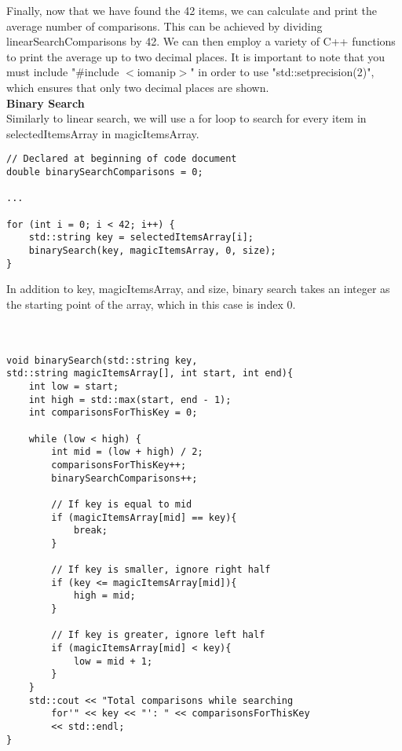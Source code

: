 \documentclass{article}
\begin{document}
Finally, now that we have found the 42 items, we can calculate and print the average number of comparisons. This can be achieved by dividing linearSearchComparisons by 42. We can then employ a variety of C++ functions to print the average up to two decimal places. It is important to note that you must include "\#include $<$iomanip$>$" in order to use "std::setprecision(2)", which ensures that only two decimal places are shown.\\


\textbf{Binary Search} \\
Similarly to linear search, we will use a for loop to search for every item in selectedItemsArray in magicItemsArray.

\begin{lstlisting}
// Declared at beginning of code document
double binarySearchComparisons = 0;

...

for (int i = 0; i < 42; i++) {
    std::string key = selectedItemsArray[i];
    binarySearch(key, magicItemsArray, 0, size);
}
\end{lstlisting}

In addition to key, magicItemsArray, and size, binary search takes an integer as the starting point of the array, which in this case is index 0. \\ \\ \\

\begin{lstlisting}
void binarySearch(std::string key, 
std::string magicItemsArray[], int start, int end){
    int low = start;
    int high = std::max(start, end - 1);
    int comparisonsForThisKey = 0;

    while (low < high) {
        int mid = (low + high) / 2;
        comparisonsForThisKey++;
        binarySearchComparisons++;

        // If key is equal to mid
        if (magicItemsArray[mid] == key){
            break;
        }
        
        // If key is smaller, ignore right half
        if (key <= magicItemsArray[mid]){
            high = mid;
        }

        // If key is greater, ignore left half
        if (magicItemsArray[mid] < key){
            low = mid + 1;
        }
    }
    std::cout << "Total comparisons while searching 
        for'" << key << "': " << comparisonsForThisKey 
        << std::endl;
}
\end{lstlisting}
\end{document}
